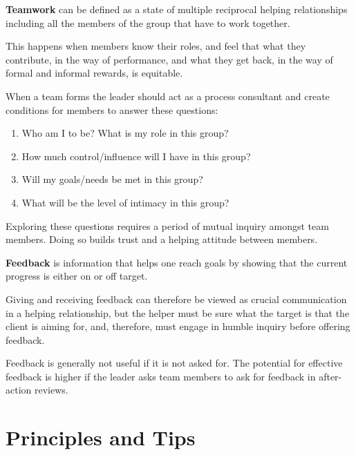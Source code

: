 \documentclass{article}
\newenvironment{nosepenumerate}
{ \begin{enumerate}
    \setlength{\itemsep}{0pt}
    \setlength{\parskip}{0pt}
    \setlength{\parsep}{0pt}     }
{ \end{enumerate}                  }
\begin{document}
\begin{multicols}{2}

\noindent
\textbf{Teamwork} can be defined as a state of multiple reciprocal helping relationships including all the members of the group that have to work together.

This happens when members know their roles, and feel that what they contribute, in the way of performance, and what they get back, in the way of formal and informal rewards, is equitable.

When a team forms the leader should act as a process consultant and create conditions for members to answer these questions:

\begin{nosepenumerate}
    \item Who am I to be? What is my role in this group?
    \item How much control/influence will I have in this group?
    \item Will my goals/needs be met in this group?
    \item What will be the level of intimacy in this group?
\end{nosepenumerate}

Exploring these questions requires a period of mutual inquiry amongst team members. Doing so builds trust and a helping attitude between members.

\textbf{Feedback} is information that helps one reach goals by showing that the current progress is either on or off target.

Giving and receiving feedback can therefore be viewed as crucial communication in a helping relationship, but the helper must be sure what the target is that the client is aiming for, and, therefore, must engage in humble inquiry before offering feedback.

Feedback is generally not useful if it is not asked for. The potential for effective feedback is higher if the leader asks team members to ask for feedback in after-action reviews.

\end{multicols}

\section{Principles and Tips}
\end{document}
